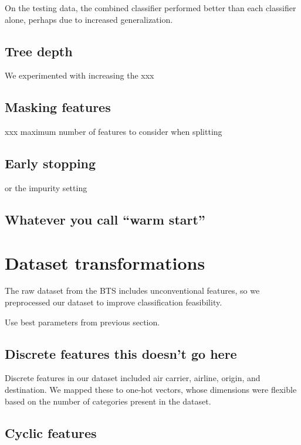 \documentclass{article}
\begin{document}
\begin{multicols}{2}

On the testing data,
the combined classifier performed better
than each classifier alone,
perhaps due to increased generalization.

\subsection{Tree depth}

We experimented with increasing the xxx

\subsection{Masking features}

xxx maximum number of features to consider when splitting

\subsection{Early stopping}

or the impurity setting

\subsection{Whatever you call ``warm start''}

\section{Dataset transformations}
\label{sec:dataset}

The raw dataset from the BTS
includes unconventional features,
so we preprocessed our dataset
to improve classification feasibility.

Use best parameters from previous section.

\subsection{Discrete features this doesn't go here}

Discrete features in our dataset included
air carrier, airline, origin, and destination.
We mapped these to one-hot vectors,
whose dimensions were flexible based on
the number of categories present in the dataset.

\subsection{Cyclic features}


\end{multicols}
\end{document}
